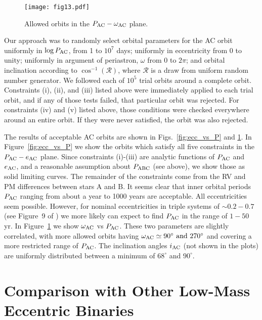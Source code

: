 \documentclass[fleqn,usenatbib]{mnras} %
\begin{document}
\begin{figure}
\centering
\texttt{[image: fig13.pdf]}
\caption{Allowed orbits in the $P_{\rm AC}-\omega_{\rm AC}$ plane.}
\label{fig:omega_vs_P}
\end{figure}

Our approach was to randomly select orbital parameters for the AC orbit uniformly in $\log P_{\rm AC}$, from 1 to $10^7$ days; uniformly in eccentricity from 0 to unity; uniformly in argument of periastron, $\omega$ from 0 to $2 \pi$; and orbital inclination according to $\cos^{-1}(\mathcal{R})$, where $\mathcal{R}$ is a draw from uniform random number generator.  We followed each of $10^5$ trial orbits around a complete orbit.  Constraints (i), (ii), and (iii) listed above were immediately applied to each trial orbit, and if any of those tests failed, that particular orbit was rejected.  For constraints (iv) and (v) listed above, those conditions were checked everywhere around an entire orbit.  If they were never satisfied, the orbit was also rejected.

The results of acceptable AC orbits are shown in Figs.~\ref{fig:ecc_vs_P} and \ref{fig:omega_vs_P}.  In Figure~\ref{fig:ecc_vs_P} we show the orbits which satisfy all five constraints in the $P_{\rm AC} - e_{\rm AC}$ plane.  Since constraints (i)-(iii) are analytic functions of $P_{\rm AC}$ and $e_{\rm AC}$, and a reasonable assumption about $P_{\rm ABC}$ (see above), we show those as solid limiting curves.  The remainder of the constraints come from the RV and PM differences between stars A and B.  It seems clear that inner orbital periods $P_{\rm AC}$ ranging from about a year to 1000 years are acceptable. All eccentricities seem possible. However, for nominal eccentricities in triple systems of $\sim$$0.2-0.7$ (see Figure~9 of \citealt{Borkovits2016}) we more likely can expect to find $P_{\rm AC}$ in the range of $1-50$ yr. In Figure~\ref{fig:omega_vs_P} we show $\omega_{\rm AC}$ vs $P_{\rm AC}$.  These two parameters are slightly correlated, with more allowed orbits having $\omega_{\rm AC} \simeq 90^\circ ~{\rm and}~270^\circ$ and covering a more restricted range of $P_{\rm AC}$.  The inclination angles $i_{\rm AC}$ (not shown in the plots) are uniformly distributed between a minimum of $68^\circ$ and $90^\circ$.

\section{Comparison with Other Low-Mass Eccentric Binaries}
\end{document}

